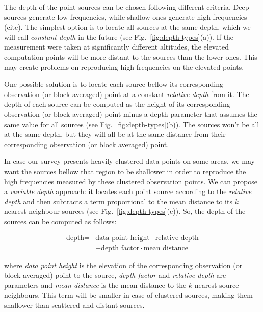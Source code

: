 \documentclass[twocolumn]{article}
\begin{document}
The depth of the point sources can be chosen following different criteria.
Deep sources generate low frequencies, while shallow ones generate high
frequencies (cite).
The simplest option is to locate all sources at the same depth, which we will
call \emph{constant depth} in the future (see Fig.~\ref{fig:depth-types}(a)).
If the measurement were taken at significantly different altitudes, the
elevated computation points will be more distant to the sources than the lower
ones.
This may create problems on reproducing high frequencies on the elevated
points.

One possible solution is to locate each source bellow its corresponding
observation (or block averaged) point at a constant \emph{relative depth}
from it.
The depth of each source can be computed as the height of its corresponding
observation (or block averaged) point minus a depth parameter that assumes the
same value for all sources (see Fig.~\ref{fig:depth-types}(b)).
The sources won't be all at the same depth, but they will all be at the same
distance from their corresponding observation (or block averaged) point.

In case our survey presents heavily clustered data points on some areas, we may
want the sources bellow that region to be shallower in order to reproduce the
high frequencies measured by these clustered observation points.
We can propose a \emph{variable depth} approach: it locates each point source
according to the \emph{relative depth} and then subtracts a term proportional
to the mean distance to its $k$ nearest neighbour sources
(see Fig.~\ref{fig:depth-types}(c)).
So, the depth of the sources can be computed as follows:

\begin{equation}
    \begin{split}
        \textrm{depth} =
           &\textrm{data point height} - \textrm{relative depth} \\
           &- \textrm{depth factor} \cdot \textrm{mean distance}
    \end{split}
\end{equation}

\noindent where \emph{data point height} is the elevation of the corresponding
observation (or block averaged) point to the source, \emph{depth factor} and
\emph{relative depth} are parameters and \emph{mean distance} is the mean
distance to the $k$ nearest source neighbours.
This term will be smaller in case of clustered sources, making them shallower
than scattered and distant sources.
\end{document}
